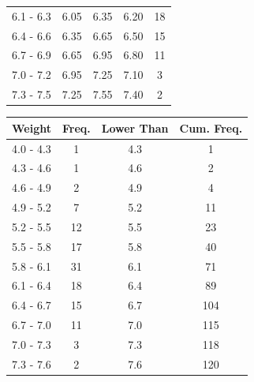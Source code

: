 \documentclass{report}
\begin{document}
\begin{multicols}{2}
\begin{enumerate}
\begin{enumerate}
\begin{center}
\begin{tabular}{|c|c|c|c|c|}
                      6.1 - 6.3 & 6.05  & 6.35  & 6.20 & 18    \\
                      6.4 - 6.6 & 6.35  & 6.65  & 6.50 & 15    \\
                      6.7 - 6.9 & 6.65  & 6.95  & 6.80 & 11    \\
                      7.0 - 7.2 & 6.95  & 7.25  & 7.10 & 3     \\
                      7.3 - 7.5 & 7.25  & 7.55  & 7.40 & 2     \\
                      \hline
                    \end{tabular}
                  \end{center}
                  \begin{center}
                    \begin{tabular}{|c|c|c|c|}
                      \hline
                      Weight    & Freq. & Lower Than & Cum. Freq. \\
                      \hline
                      4.0 - 4.3 & 1     & 4.3        & 1          \\
                      4.3 - 4.6 & 1     & 4.6        & 2          \\
                      4.6 - 4.9 & 2     & 4.9        & 4          \\
                      4.9 - 5.2 & 7     & 5.2        & 11         \\
                      5.2 - 5.5 & 12    & 5.5        & 23         \\
                      5.5 - 5.8 & 17    & 5.8        & 40         \\
                      5.8 - 6.1 & 31    & 6.1        & 71         \\
                      6.1 - 6.4 & 18    & 6.4        & 89         \\
                      6.4 - 6.7 & 15    & 6.7        & 104        \\
                      6.7 - 7.0 & 11    & 7.0        & 115        \\
                      7.0 - 7.3 & 3     & 7.3        & 118        \\
                      7.3 - 7.6 & 2     & 7.6        & 120        \\
                      \hline
                    \end{tabular}
                  \end{center}


\end{enumerate}
\end{enumerate}
\end{multicols}
\end{document}
